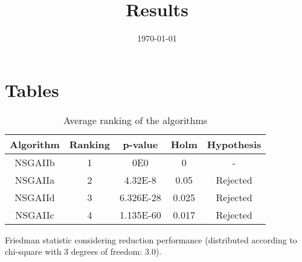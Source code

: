 \documentclass{article}
\title{Results}
\author{}
\date{\today}
\begin{document}
\oddsidemargin 0in \topmargin 0in\maketitle

\section{Tables}
\begin{table}[!htp]
\centering
\begin{tabular}{c|c|c|c|c}
Algorithm&Ranking&p-value&Holm&Hypothesis\\
\hline
NSGAIIb & 1 & 0E0 & 0 & -\\
NSGAIIa & 2 & 4.32E-8 & 0.05 & Rejected\\
NSGAIId & 3 & 6.326E-28 & 0.025 & Rejected\\
NSGAIIc & 4 & 1.135E-60 & 0.017 & Rejected\\
\end{tabular}
\caption{Average ranking of the algorithms}
\end{table}


Friedman statistic considering reduction performance (distributed according to chi-square with 3 degrees of freedom: 3.0).
\end{document}
